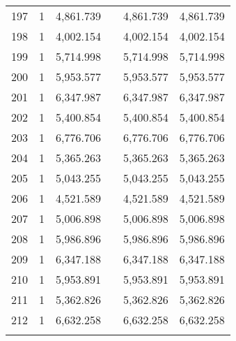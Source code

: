 \begin{table}[!htbp]
\begin{tabular}{@{\extracolsep{5pt}}lccccc}
197 & 1 & 4,861.739 &  & 4,861.739 & 4,861.739 \\ 
198 & 1 & 4,002.154 &  & 4,002.154 & 4,002.154 \\ 
199 & 1 & 5,714.998 &  & 5,714.998 & 5,714.998 \\ 
200 & 1 & 5,953.577 &  & 5,953.577 & 5,953.577 \\ 
201 & 1 & 6,347.987 &  & 6,347.987 & 6,347.987 \\ 
202 & 1 & 5,400.854 &  & 5,400.854 & 5,400.854 \\ 
203 & 1 & 6,776.706 &  & 6,776.706 & 6,776.706 \\ 
204 & 1 & 5,365.263 &  & 5,365.263 & 5,365.263 \\ 
205 & 1 & 5,043.255 &  & 5,043.255 & 5,043.255 \\ 
206 & 1 & 4,521.589 &  & 4,521.589 & 4,521.589 \\ 
207 & 1 & 5,006.898 &  & 5,006.898 & 5,006.898 \\ 
208 & 1 & 5,986.896 &  & 5,986.896 & 5,986.896 \\ 
209 & 1 & 6,347.188 &  & 6,347.188 & 6,347.188 \\ 
210 & 1 & 5,953.891 &  & 5,953.891 & 5,953.891 \\ 
211 & 1 & 5,362.826 &  & 5,362.826 & 5,362.826 \\ 
212 & 1 & 6,632.258 &  & 6,632.258 & 6,632.258 \\ 
\hline \\[-1.8ex] 
\end{tabular} 
\end{table} 
